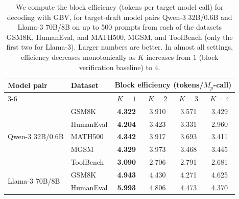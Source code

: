\documentclass{article}
\theoremstyle{plain}
\theoremstyle{definition}
\theoremstyle{remark}
\begin{document}
\begin{table}[htbp]
\centering
\begin{tabular}{@{}llcccc@{}}
\toprule
\textbf{Model pair} & \textbf{Dataset} & \multicolumn{4}{c}{\textbf{Block efficiency} (tokens/$M_p$-call)} \\
\cmidrule(lr){3-6}
& & \textbf{$K=1$} & \textbf{$K=2$} & \textbf{$K=3$} & \textbf{$K=4$} \\
\midrule
\multirow{5}{*}{Qwen-3 32B/0.6B}
& GSM8K      & \textbf{4.322} & 3.910 & 3.571 & 3.429 \\
& HumanEval  & \textbf{4.204} & 3.423 & 3.331 & 2.960 \\
& MATH500    & \textbf{4.342} & 3.917 & 3.693 & 3.411 \\
& MGSM       & \textbf{4.329} & 3.973 & 3.468 & 3.445 \\
& ToolBench  & \textbf{3.090} & 2.706 & 2.791 & 2.681 \\
\midrule
\multirow{2}{*}{Llama-3 70B/8B}
& GSM8K      & \textbf{4.943} & 4.430 & 4.271 & 4.625 \\
& HumanEval  & \textbf{5.993} & 4.806 & 4.473 & 4.370 \\
\bottomrule
\end{tabular}
\caption{We compute the block efficiency (tokens per target model call) for decoding with GBV, for target-draft model pairs Qwen-3 32B/0.6B and Llama-3 70B/8B on up to 500 prompts from each of the datasets GSM8K, HumanEval, and MATH500, MGSM, and ToolBench (only the first two for Llama-3). Larger numbers are better. In almost all settings, efficiency decreases monotonically as $K$ increases from $1$ (block verification baseline) to $4$.}
\label{tab:qwen-block-eff}
\end{table}
\end{document}
